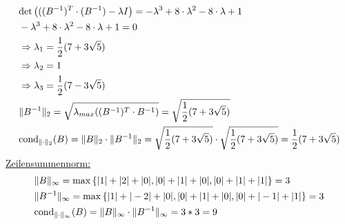 \begin{align*}
\begin{split}
&\mathrm{det}\left(((B^{-1})^T\cdot(B^{-1})-\lambda I \right)=-\lambda^3+8\cdot\lambda^2-8\cdot\lambda+1\\
&-\lambda^3+8\cdot\lambda^2-8\cdot\lambda+1=0\\
&\Rightarrow \lambda_{1}=\frac{1}{2}(7+3\sqrt{5})\\
&\Rightarrow\lambda_{2}=1\\
&\Rightarrow\lambda_{3}=\frac{1}{2}(7-3\sqrt{5})\\
&\|B^{-1}\|_2=\sqrt{\lambda_{max}((B^{-1})^T\cdot B^{-1})}=\sqrt{\frac{1}{2}(7+3\sqrt{5})}\\
&\mathrm{cond}_{\| \cdot \|_2}(B)=\|B\|_2\cdot\|B^{-1}\|_2=\sqrt{\frac{1}{2}(7+3\sqrt{5})}\cdot\sqrt{\frac{1}{2}(7+3\sqrt{5})}=\frac{1}{2}(7+3\sqrt{5})
\end{split}
\end{align*}
\underline{Zeilensummennorm:}
\begin{align*}
\begin{split}
&\|B\|_\infty = \mathrm{max} \left\lbrace|1|+|2|+|0|, |0|+|1|+|0|,|0|+|1|+|1|\right\rbrace = 3\\
&\|B^{-1}\|_\infty = \mathrm{max} \left\lbrace|1|+|-2|+|0|, |0|+|1|+|0|,|0|+|-1|+|1|\right\rbrace = 3\\
&\mathrm{cond}_{\| \cdot \|_\infty}(B)=\|B\|_\infty\cdot\|B^{-1}\|_\infty = 3 * 3 = 9\\
\end{split}
\end{align*}
